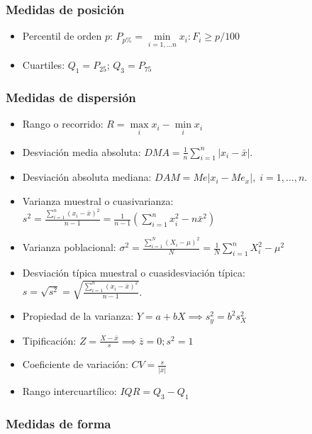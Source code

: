 \documentclass[
]{article}
\begin{document}
\hypertarget{medidas-de-posiciuxf3n}{%
\subsubsection{Medidas de posición}\label{medidas-de-posiciuxf3n}}

\begin{itemize}
\item
  Percentil de orden \(p\):
  \(P_{p\%} = \min\limits_{i=1,...n}{x_i}: F_i\geq p/ 100\)
\item
  Cuartiles: \(Q_1 = P_{25}\); \(Q_3 = P_{75}\)
\end{itemize}

\hypertarget{medidas-de-dispersiuxf3n}{%
\subsubsection{Medidas de dispersión}\label{medidas-de-dispersiuxf3n}}

\begin{itemize}
\item
  Rango o recorrido: \(R = \max\limits_i{x_i} - \min\limits_i{x_i}\)
\item
  Desviación media absoluta:
  \(\mathit{DMA} = \frac{1}{n}\sum\limits_{i=1}^n |x_i-\bar x|.\)
\item
  Desviación absoluta mediana:
  \(\mathit{DAM} = Me |x_i- Me_x|,\; i = 1, \ldots, n.\)
\item
  Varianza muestral o cuasivarianza:
  \(s^2= \frac{\sum\limits_{i=1}^n (x_i- \bar{x})^2}{n-1} = \frac{1}{n-1}\left (\sum\limits_{i=1}^n x_i^2 - n \bar x^2\right )\)
\item
  Varianza poblacional:
  \(\sigma^2= \frac{\sum\limits_{i=1}^N (X_i- \mu)^2}{N} = \frac{1}{N} \sum\limits_{i=1}^n X_i^2 - \mu^2\)
\item
  Desviación típica muestral o cuasidesviación típica:
  \(s= \sqrt{s^2} = \sqrt{\frac{\sum\limits_{i=1}^n (x_i- \bar{x})^2}{n-1}}\).
\item
  Propiedad de la varianza: \(Y=a+bX \implies s_y^2=b^2s^2_X\)
\item
  Tipificación: \(Z = \frac{X-\bar x}{s} \implies \bar z = 0; s^2 = 1\)
\item
  Coeficiente de variación: \(\mathit{CV} = \frac{s}{|\bar x|}\)
\item
  Rango intercuartílico: \(IQR = Q_3 - Q_1\)
\end{itemize}

\hypertarget{medidas-de-forma}{%
\subsubsection{Medidas de forma}\label{medidas-de-forma}}
\end{document}
